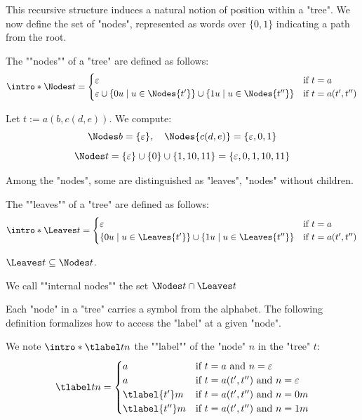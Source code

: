 \documentclass[twoside]{article}
\begin{document}
This recursive structure induces a natural notion of position within a "tree". We now define the set of "nodes",
represented as words over $\{0,1\}$ indicating a path from the root.

\begin{definition}["Nodes"]
	\AP The ""nodes"" of a "tree" are defined as follows:
	\[
		\intro* \Nodes t =
		\begin{cases}
			\varepsilon                             & \text{if } t = a         \\
			\varepsilon \cup \setdef {0u} {u \in \Nodes {t'}}
			\cup \setdef {1u} {u \in \Nodes {t''} } & \text{if } t = a(t',t'')
		\end{cases}
	\]
\end{definition}

\begin{example}
	Let $ t := a(b, c(d, e)) $. We compute:
	\[
		\Nodes b  = \{\varepsilon\}, \quad \Nodes {c(d, e)} = \{\varepsilon, 0, 1\}
	\]
	\[
		\Nodes t = \{\varepsilon\} \cup \{0\} \cup \{1, 10, 11\} = \{\varepsilon, 0, 1, 10, 11\}
	\]
\end{example}

Among the "nodes", some are distinguished as "leaves", "nodes" without children.

\begin{definition}["Leaves"]
	\AP The ""leaves"" of a "tree" are defined as follows:
	\[
		\intro* \Leaves t = \begin{cases}
			\varepsilon                              & \text{if } t = a         \\
			\setdef {0u} {u \in \Leaves {t'}}
			\cup \setdef {1u} {u \in \Leaves {t''} } & \text{if } t = a(t',t'')
		\end{cases}
	\]
\end{definition}

\begin{remark}
	$\Leaves t \subseteq \Nodes t$.
\end{remark}

\begin{definition}
	We call ""internal nodes"" the set $\Nodes t \cap \Leaves t$
\end{definition}


Each "node" in a "tree" carries a symbol from the alphabet. The following definition formalizes how to
access the "label" at a given "node".

\begin{definition}
	\AP We note $\intro* \tlabel t n$ the ""label"" of the "node" $n$ in the "tree" $t$:
	\[
		\tlabel t n =   \begin{cases}
			a               & \text{if } t = a \text{ and } n = \varepsilon         \\
			a               & \text{if } t = a(t',t'') \text{ and } n = \varepsilon \\
			\tlabel {t'} m  & \text{if } t = a(t',t'') \text{ and } n = 0m          \\
			\tlabel {t''} m & \text{if } t = a(t',t'') \text{ and } n = 1m
		\end{cases}
	\]
\end{definition}
\end{document}
